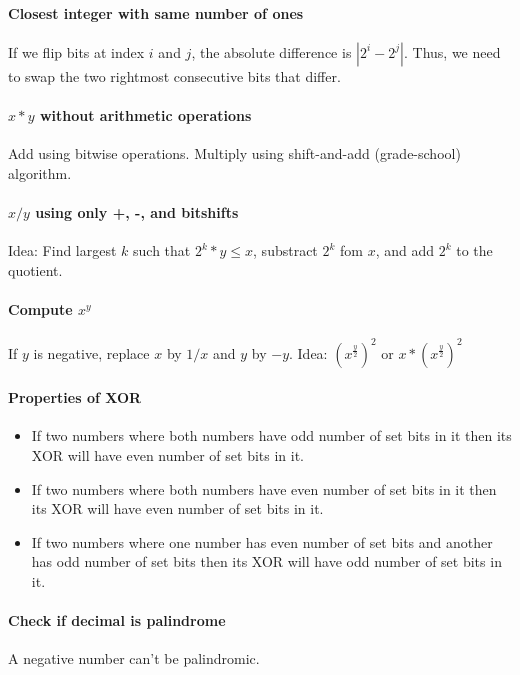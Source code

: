 \documentclass[runningheads]{llncs}
\begin{document}
\paragraph{Closest integer with same number of ones}
If we flip bits at index $i$ and $j$, the absolute difference is $|2^i - 2^j|$.
Thus, we need to swap the two rightmost consecutive bits that differ.

\paragraph{$x*y$ without arithmetic operations}
Add using bitwise operations. Multiply using shift-and-add (grade-school) algorithm.

\paragraph{$x/y$ using only +, -, and bitshifts}
Idea: Find largest $k$ such that $2^k * y \leq x$, substract $2^k$ fom $x$, and add $2^k$ to the quotient.

\paragraph{Compute $x^y$}
If $y$ is negative, replace $x$ by $1/x$ and $y$ by $-y$.
Idea: $(x^\frac{y}{2})^2$ or $x * (x^\frac{y}{2})^2$

\paragraph{Properties of XOR}
\begin{itemize}
\item If two numbers where both numbers have odd number of set bits in it then its XOR will have even number of set bits in it.
\item If two numbers where both numbers have even number of set bits in it then its XOR will have even number of set bits in it.
\item If two numbers where one number has even number of set bits and another has odd number of set bits then its XOR will have odd number of set bits in it.
\end{itemize}

\paragraph{Check if decimal is palindrome}
A negative number can't be palindromic.
\end{document}

